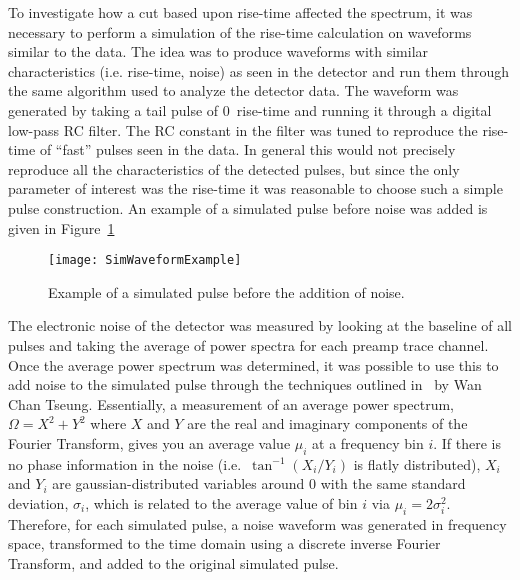 	To investigate how a cut based upon rise-time affected the spectrum, it was necessary to perform a simulation of the rise-time calculation on waveforms similar to the data.  The idea was to produce waveforms with similar characteristics (i.e. rise-time, noise) as seen in the detector and run them through the same algorithm used to analyze the detector data.  The waveform was generated by taking a tail pulse of 0~rise-time and running it through a digital low-pass RC filter.  The RC constant in the filter was tuned to reproduce the rise-time of ``fast'' pulses seen in the data.  In general this would not precisely reproduce all the characteristics of the detected pulses, but since the only parameter of interest was the rise-time it was reasonable to choose such a simple pulse construction.  An example of a simulated pulse before noise was added is given in Figure~\ref{fig:SimWaveformExample}
				\begin{figure}
					\centering
					\texttt{[image: SimWaveformExample]}
					\caption[Example of a simulated pulse before the addition of noise]
					{Example of a simulated pulse before the addition of noise.}
					\label{fig:SimWaveformExample}
				\end{figure}
	
	The electronic noise of the detector was measured by looking at the baseline of all pulses and taking the average of power spectra for each preamp trace channel.  Once the average power spectrum was determined, it was possible to use this to add noise to the simulated pulse through the techniques outlined in~\cite{WanThesis08} by Wan Chan Tseung.  Essentially, a measurement of an average power spectrum, $\Omega = X^{2} + Y^{2}$ where $X$ and $Y$ are the real and imaginary components of the Fourier Transform, gives you an average value $\mu_{i}$ at a frequency bin $i$.  If there is no phase information in the noise (i.e.~$\tan^{-1} (X_{i}/Y_{i})$ is flatly distributed), $X_{i}$ and $Y_{i}$ are gaussian-distributed variables around 0 with the same standard deviation, $\sigma_{i}$, which is related to the average value of bin $i$ via  $\mu_{i} = 2 \sigma_{i}^{2}$.  Therefore, for each simulated pulse, a noise waveform was generated in frequency space, transformed to the time domain using a discrete inverse Fourier Transform, and added to the original simulated pulse.  
	
